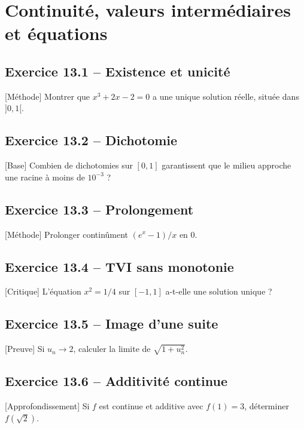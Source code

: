 \chapter{Continuité, valeurs intermédiaires et équations}
\section*{Exercice 13.1 -- Existence et unicité}
[Méthode] Montrer que $x^3+2x-2=0$ a une unique solution réelle, située dans $]0,1[$.

\section*{Exercice 13.2 -- Dichotomie}
[Base] Combien de dichotomies sur $[0,1]$ garantissent que le milieu approche une racine à moins de $10^{-3}$ ?

\section*{Exercice 13.3 -- Prolongement}
[Méthode] Prolonger continûment $(e^x-1)/x$ en 0.

\section*{Exercice 13.4 -- TVI sans monotonie}
[Critique] L'équation $x^2=1/4$ sur $[-1,1]$ a-t-elle une solution unique ?

\section*{Exercice 13.5 -- Image d’une suite}
[Preuve] Si $u_n\to2$, calculer la limite de $\sqrt{1+u_n^2}$.

\section*{Exercice 13.6 -- Additivité continue}
[Approfondissement] Si $f$ est continue et additive avec $f(1)=3$, déterminer $f(\sqrt2)$.
